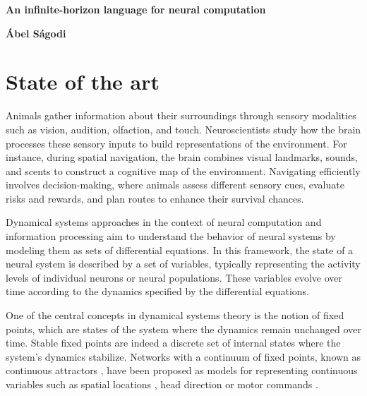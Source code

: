 \documentclass[12pt,letterpaper, onecolumn]{article}
\theoremstyle{definition}
\theoremstyle{remark}
\begin{document}

\begin{center}
\LARGE{\bf An infinite-horizon language for neural computation}
\end{center}
\begin{center}
{\textbf{\'Abel S\'agodi}}
\end{center}

\section{State of the art}
Animals gather information about their surroundings through sensory modalities such as vision, audition, olfaction, and touch. Neuroscientists study how the brain processes these sensory inputs to build representations of the environment. For instance, during spatial navigation, the brain combines visual landmarks, sounds, and scents to construct a cognitive map of the environment. Navigating efficiently involves decision-making, where animals assess different sensory cues, evaluate risks and rewards, and plan routes to enhance their survival chances. 

Dynamical systems approaches in the context of neural computation and information processing aim to understand the behavior of neural systems by modeling them as sets of differential equations. In this framework, the state of a neural system is described by a set of variables, typically representing the activity levels of individual neurons or neural populations. These variables evolve over time according to the dynamics specified by the differential equations. 

One of the central concepts in dynamical systems theory is the notion of fixed points, which are states of the system where the dynamics remain unchanged over time. Stable fixed points are indeed a discrete set of internal states where the system's dynamics stabilize. Networks with a continuum of fixed points, known as continuous attractors \citep{khona2022}, have been proposed as models for representing continuous variables such as spatial locations \citep{samsonovich1997, stringer2002placecells, yang2022}, head direction \citep{stringer2002headdirection, hulse2020, turner2017, turner2020neuroanatomical, vafidis2022, kim2019generation} or motor commands \citep{stringer2003}.
\end{document}
